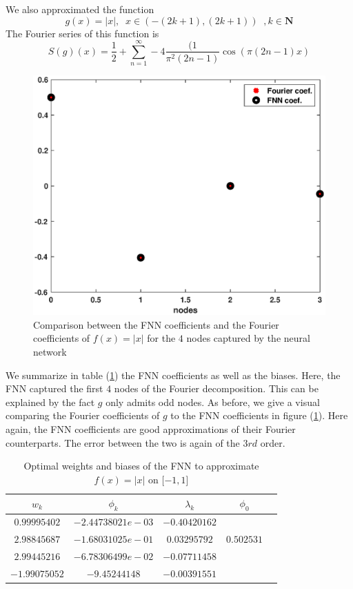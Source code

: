 \documentclass[AMS,STIX1COL]{WileyNJD-v2}
\begin{document}
We also approximated the function
$$
g(x) = |x|, \;\; \text{$x \in \left(-(2k+1), (2k+1)\right)$}\;\;, k \in \mathbf{N}
$$
The Fourier series of this function is
$$
S(g)(x)= \frac{1}{2} + \sum_{n=1}^{\infty} -4 \frac{(1}{\pi^2 (2n - 1)} \cos(\pi (2n - 1)x)
$$

  \begin{figure}[!htb]
    \centering
    \includegraphics[width=.8\textwidth]{fnncoeffvsfourcoeffabsx.eps}
    \caption{Comparison between the FNN coefficients and the Fourier coefficients of $f(x) = |x|$ for the $4$ nodes captured by the neural network}
    \label{Fnnabsx}
\end{figure}

We summarize in table (\ref{tabfnnx2}) the FNN coefficients as well as the biases. Here, the FNN captured the first $4$ nodes of the Fourier decomposition. This can be explained by the fact $g$ only admits odd nodes. As before, we give a visual comparing the Fourier coefficients of $g$ to the FNN coefficients in figure (\ref{Fnnabsx}). Here again, the FNN coefficients are good approximations of their Fourier counterparts. The error between the two is again of the $3rd$ order.\\


\begin{table}[!h]
  \begin{center}
  \begin{tabular}{ |c|c|c|c|c| } 
\hline
$w_k$ & $\phi_k$ & $\lambda_k$& $\phi_0$ \\
\hline
$ 0.99995402$ & $-2.44738021e-03$ &$-0.40420162$& \\ 
$2.98845687$&$-1.68031025e-01$ & $0.03295792$& $0.502531$ \\ 
$2.99445216$& $-6.78306499e-02$ & $-0.07711458$& \\ 
$ -1.99075052$& $-9.45244148$ & $ -0.00391551$& \\ 
\hline
\end{tabular}
\caption{Optimal weights and biases of the FNN to approximate $ f(x) = |x|$ on $[-1, 1$]}\label{tabfnnx2}
\end{center}
\end{table}
\end{document}

